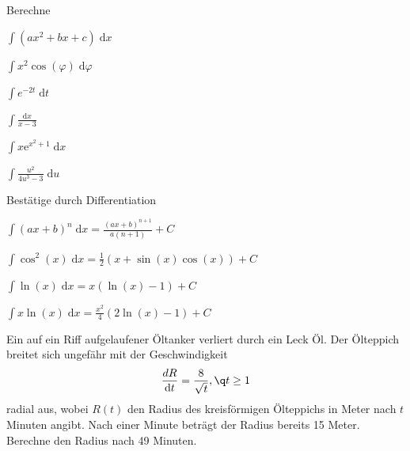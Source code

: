 \documentclass[%
11pt,%
twoside,%
titlepage,%
german,%
headsepline%
]{scrartcl}
\begin{document}
\clearpage

\begin{ueb}[integrieren]
Berechne

\begin{minipage}{0.5\textwidth}
\begin{enumeratea}
\item $\int (ax^2+bx+c)\;\mathrm{d}x$
\item $\int x^2\cos(\varphi)\;\mathrm{d}\varphi$
\item $\int e^{-2t}\;\mathrm{d}t$
\end{enumeratea}
\end{minipage}
\begin{minipage}{0.5\textwidth}
\begin{enumeratea}
\setcounter{enumi}{3}
\item $\int\frac{\mathrm{d}x}{x-3}$
\item $\int x\mathrm{e}^{x^2+1}\;\mathrm{d}x$
\item $\int\frac{u^2}{4u^3-3}\;\mathrm{d}u$
\end{enumeratea}
\end{minipage}
\end{ueb}

\begin{ueb}[Umkehrung]
Bestätige durch Differentiation

\begin{minipage}{0.5\textwidth}
\begin{enumeratea}
\item $\int (ax+b)^n\;\mathrm{d}x=\frac{(ax+b)^{n+1}}{a(n+1)}+C$
\item $\int \cos^2(x)\;\mathrm{d}x=\frac{1}{2}(x+\sin(x)\cos(x))+C$
\end{enumeratea}
\end{minipage}
\begin{minipage}{0.5\textwidth}
\begin{enumeratea}
\setcounter{enumi}{2}
\item $\int\ln(x)\;\mathrm{d}x=x(\ln( x)-1)+C$
\item $\int x\ln (x)\;\mathrm{d}x=\frac{x^2}{4}(2\ln(x)-1)+C$
\end{enumeratea}
\end{minipage}
\end{ueb}

\begin{ueb}[Öl]
Ein auf ein Riff aufgelaufener Öltanker verliert durch ein Leck Öl. Der Ölteppich breitet sich ungefähr mit der Geschwindigkeit
$$\frac{dR}{\mathrm{d}t}=\frac{8}{\sqrt{t}},\q t\geq1$$
radial aus, wobei $R(t)$ den Radius des kreisförmigen Ölteppichs in Meter nach $t$ Minuten angibt. Nach einer Minute beträgt der Radius bereits 15 Meter. Berechne den Radius nach 49 Minuten.
\end{ueb}
\end{document}
